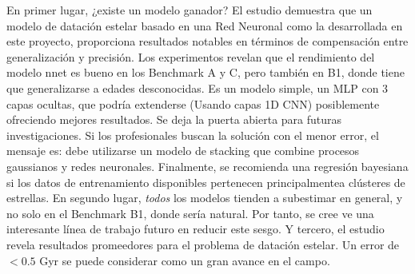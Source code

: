 En primer lugar, ¿existe un modelo ganador? El estudio demuestra que un modelo de datación estelar basado en una Red Neuronal como la desarrollada en este proyecto, proporciona resultados notables en términos de compensación entre generalización y precisión. Los experimentos revelan que el rendimiento del modelo nnet es bueno en los Benchmark A y C, pero también en B1, donde tiene que generalizarse a edades desconocidas. Es un modelo simple, un MLP con 3 capas ocultas, que podría extenderse (\eg Usando capas 1D CNN) posiblemente ofreciendo mejores resultados. Se deja la puerta abierta para futuras investigaciones. Si los profesionales buscan la solución con el menor error, el mensaje es: debe utilizarse un modelo de stacking que combine procesos gaussianos y redes neuronales. Finalmente, se recomienda una regresión bayesiana si los datos de entrenamiento disponibles pertenecen principalmentea clústeres de estrellas. En segundo lugar, \emph{todos} los modelos tienden a subestimar en general, y no solo en el Benchmark B1, donde sería natural. Por tanto, se cree ve una interesante línea de trabajo futuro en reducir este sesgo. Y tercero, el estudio revela resultados promeedores para el problema de datación estelar. Un error de $<0.5$ Gyr se puede considerar como un gran avance en el campo.

